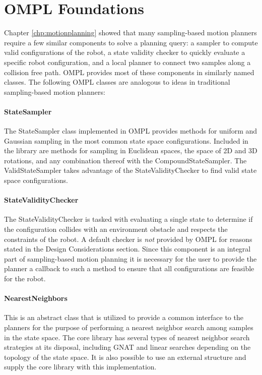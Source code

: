 \section {OMPL Foundations}
Chapter \ref{chp:motionplanning} showed that many sampling-based motion planners
require a few similar components to solve a planning query: a sampler to compute
valid configurations of the robot, a state validity checker to quickly evaluate
a specific robot configuration, and a local planner to connect two samples along
a collision free path.  OMPL provides most of these components in similarly 
named classes.  The following OMPL classes are analogous to ideas in traditional
sampling-based motion planners:

\paragraph {StateSampler} The StateSampler class implemented in OMPL 
provides methods for uniform and Gaussian sampling in the most common state
space configurations.  Included in the library are methods for sampling
in Euclidean spaces, the space of 2D and 3D rotations, and any combination
thereof with the CompoundStateSampler.  The ValidStateSampler takes advantage 
of the StateValidityChecker to find valid state space configurations.

\paragraph {StateValidityChecker} The StateValidityChecker is tasked with
evaluating a single state to determine if the configuration collides with an
environment obstacle and respects the constraints of the robot.  A default 
checker is \emph{not} provided by OMPL for reasons stated in the Design 
Considerations section.  Since this component is an integral part of 
sampling-based motion planning it is necessary for the user to provide the 
planner a callback to such a method to ensure that all configurations are 
feasible for the robot.

\paragraph {NearestNeighbors} This is an abstract class that is utilized
to provide a common interface to the planners for the purpose of performing a
nearest neighbor search among samples in the state space.  The core library
has several types of nearest neighbor search strategies at its disposal, 
including GNAT and linear searches depending on the topology of the state space.  
It is also possible to use an external structure and supply the core library 
with this implementation.

